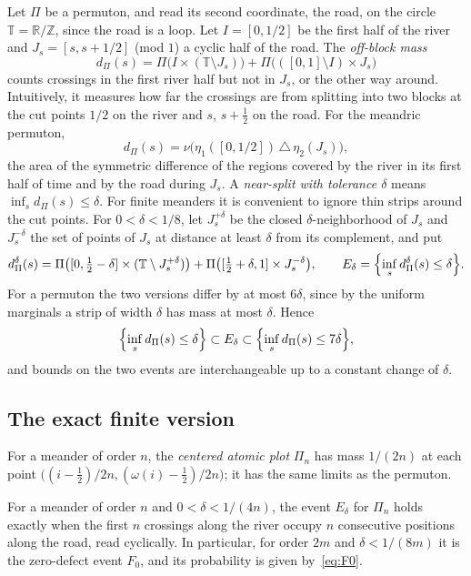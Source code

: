 Let $\Pi$ be a permuton, and read its second coordinate, the road, on the circle
$\mathbb T=\mathbb R/\mathbb Z$, since the road is a loop. Let $I=[0,1/2]$ be the first half of the river and $J_s=[s,s+1/2]$
(mod $1$) a cyclic half of the road. The \emph{off-block mass}
\[
d_\Pi(s)=\Pi\bigl(I\times(\mathbb T\setminus J_s)\bigr)+\Pi\bigl(([0,1]\setminus I)\times J_s\bigr)
\]
counts crossings in the first river half but not in $J_s$, or the other way around.
Intuitively, it measures how far the crossings are from splitting into two blocks at the cut
points $1/2$ on the river and $s$, $s+\frac12$ on the road. For the meandric permuton,
\[
d_\Pi(s)=\nu\bigl(\eta_1([0,1/2])\,\triangle\,\eta_2(J_s)\bigr),
\]
the area of the symmetric difference of the regions covered by the river in its first half of time
and by the road during $J_s$. A \emph{near-split with tolerance $\delta$} means
$\inf_sd_\Pi(s)\le\delta$. For finite meanders it is convenient to ignore thin strips around the cut
points. For
$0<\delta<1/8$, let $J_s^{+\delta}$ be the closed $\delta$-neighborhood of $J_s$ and $J_s^{-\delta}$
the set of points of $J_s$ at distance at least $\delta$ from its complement, and put
\[
d^\delta_\Pi(s)=\Pi\bigl([0,\tfrac12-\delta]\times(\mathbb T\setminus J_s^{+\delta})\bigr)
+\Pi\bigl([\tfrac12+\delta,1]\times J_s^{-\delta}\bigr),\qquad
E_\delta=\Bigl\{\inf_sd^\delta_\Pi(s)\le\delta\Bigr\}.
\]
For a permuton the two versions differ by at most $6\delta$, since by the uniform marginals a strip
of width $\delta$ has mass at most $\delta$. Hence
\begin{equation}\label{eq:sandwich}
\Bigl\{\inf_sd_\Pi(s)\le\delta\Bigr\}\subset E_\delta\subset\Bigl\{\inf_sd_\Pi(s)\le7\delta\Bigr\},
\end{equation}
and bounds on the two events are interchangeable up to a constant change of $\delta$.

\subsection{The exact finite version}

For a meander of order $n$, the \emph{centered atomic plot} $\Pi_n$ has mass $1/(2n)$ at each point
$\bigl((i-\frac12)/2n,(\omega(i)-\frac12)/2n\bigr)$; it has the same limits as the permuton.

\begin{proposition}\label{prop:micro}
For a meander of order $n$ and $0<\delta<1/(4n)$, the event $E_\delta$ for $\Pi_n$ holds exactly
when the first $n$ crossings along the river occupy $n$ consecutive positions along the road, read
cyclically. In particular, for order $2m$ and $\delta<1/(8m)$ it is the zero-defect event $F_0$,
and its probability is given by~\eqref{eq:F0}.
\end{proposition}

